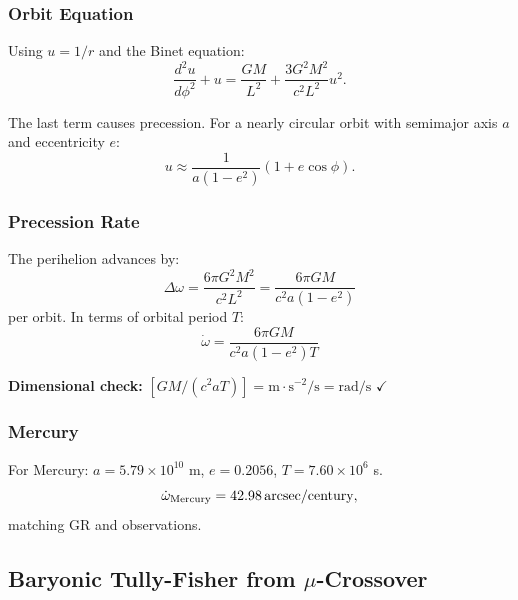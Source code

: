 \subsubsection{Orbit Equation}

Using $u = 1/r$ and the Binet equation:
\begin{equation}
\frac{d^2 u}{d\phi^2} + u = \frac{GM}{L^2} + \frac{3G^2M^2}{c^2 L^2}u^2.
\end{equation}

The last term causes precession. For a nearly circular orbit with 
semimajor axis $a$ and eccentricity $e$:
\begin{equation}
u \approx \frac{1}{a(1-e^2)}(1 + e\cos\phi).
\end{equation}

\subsubsection{Precession Rate}

The perihelion advances by:
\begin{equation}
\Delta\omega = \frac{6\pi G^2 M^2}{c^2 L^2} = \frac{6\pi GM}{c^2 a(1-e^2)}
\end{equation}
per orbit. In terms of orbital period $T$:
\begin{equation}
\boxed{\dot{\omega} = \frac{6\pi GM}{c^2 a(1-e^2)T}}
\label{eq:perihelion-appendix}
\end{equation}

\textbf{Dimensional check:} $[GM/(c^2 a T)] = \text{m}\cdot\text{s}^{-2}/\text{s} = \text{rad/s}$ $\checkmark$

\subsubsection{Mercury}

For Mercury: $a = 5.79 \times 10^{10}$ m, $e = 0.2056$, $T = 7.60 \times 10^6$ s.
\begin{equation}
\dot{\omega}_{\rm Mercury} = 42.98\,\text{arcsec/century},
\end{equation}
matching GR and observations.

\subsection{Baryonic Tully-Fisher from $\mu$-Crossover}\label{app:btfr}

